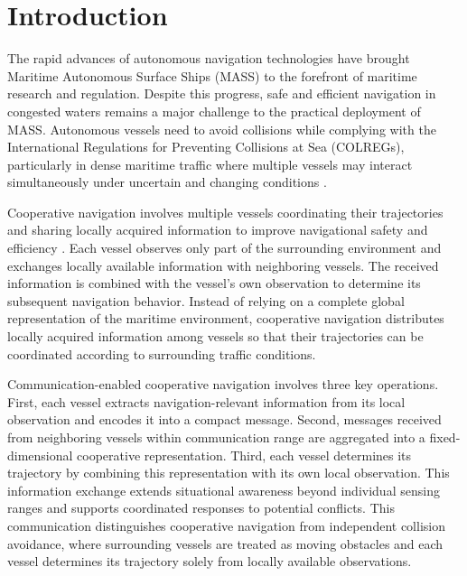 \documentclass[final,5p,times,twocolumn]{elsarticle}
\begin{document}
\section{Introduction}
{\color{violet}
The rapid advances of autonomous navigation technologies have brought Maritime Autonomous Surface Ships (MASS) to the forefront of maritime research and regulation. Despite this progress, safe and efficient navigation in congested waters remains a major challenge to the practical deployment of MASS. Autonomous vessels need to avoid collisions while complying with the International Regulations for Preventing Collisions at Sea (COLREGs), particularly in dense maritime traffic where multiple vessels may interact simultaneously under uncertain and changing conditions \citep{Complexity,Sarhadi}.

Cooperative navigation involves multiple vessels coordinating their trajectories and sharing locally acquired information to improve navigational safety and efficiency \citep{Akdag,chen}. Each vessel observes only part of the surrounding environment and exchanges locally available information with neighboring vessels. The received information is combined with the vessel's own observation to determine its subsequent navigation behavior. Instead of relying on a complete global representation of the maritime environment, cooperative navigation distributes locally acquired information among vessels so that their trajectories can be coordinated according to surrounding traffic conditions.

Communication-enabled cooperative navigation involves three key operations. First, each vessel extracts navigation-relevant information from its local observation and encodes it into a compact message. Second, messages received from neighboring vessels within communication range are aggregated into a fixed-dimensional cooperative representation. Third, each vessel determines its trajectory by combining this representation with its own local observation. This information exchange extends situational awareness beyond individual sensing ranges and supports coordinated responses to potential conflicts. This communication distinguishes cooperative navigation from independent collision avoidance, where surrounding vessels are treated as moving obstacles and each vessel determines its trajectory solely from locally available observations.

}
\end{document}
